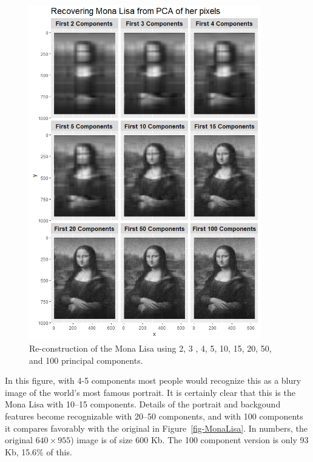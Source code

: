 \documentclass[
  letterpaper,
  10pt,
  krantz2]{krantz}
\begin{document}
\begin{figure}

{\centering \includegraphics[width=0.9\textwidth,height=\textheight]{images/mona-pca.png}

}

\caption{\label{fig-mona-pca}Re-construction of the Mona Lisa using 2, 3
, 4, 5, 10, 15, 20, 50, and 100 principal components.}

\end{figure}

In this figure, with 4-5 components most people would recognize this as
a blury image of the world's most famous portrait. It is certainly clear
that this is the Mona Lisa with 10--15 components. Details of the
portrait and backgound features become recognizable with 20--50
components, and with 100 components it compares favorably with the
original in Figure~\ref{fig-MonaLisa}. In numbers, the original
\(640 \times 955\)) image is of size 600 Kb. The 100 component version
is only 93 Kb, 15.6\% of this.
\end{document}
